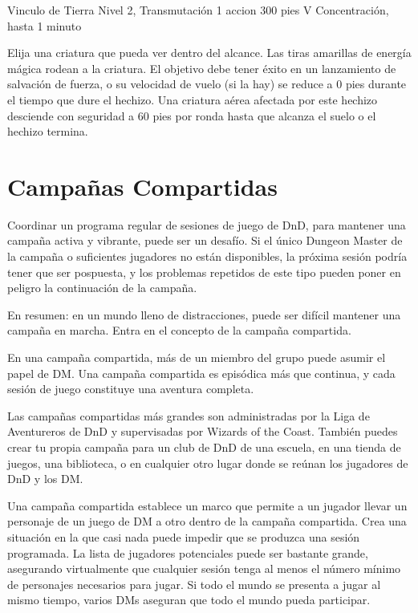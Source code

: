 \documentclass[a4paper,twocolumn,openany,10pt]{dndbook}
\begin{document}
\spellheader%
	{Vinculo de Tierra}
	{Nivel 2, Transmutación}
	{1 accion}
	{300 pies}
	{V}
	{Concentración, hasta 1 minuto}
	
	Elija una criatura que pueda ver dentro del alcance. Las tiras amarillas de energía mágica rodean a la criatura. El objetivo
	debe tener éxito en un lanzamiento de salvación de fuerza, o su velocidad de vuelo (si la hay) se reduce a 0 pies durante el
	tiempo que dure el hechizo. Una criatura aérea afectada por este hechizo desciende con seguridad a 60 pies por ronda hasta
	que alcanza el suelo o el hechizo termina. 

\appendix

\chapter{Campañas Compartidas}

Coordinar un programa regular de sesiones de juego de DnD, para mantener una campaña activa y vibrante, puede ser un desafío. Si
el único Dungeon Master de la campaña o suficientes jugadores no están disponibles, la próxima sesión podría tener que ser
pospuesta, y los problemas repetidos de este tipo pueden poner en peligro la continuación de la campaña.

En resumen: en un mundo lleno de distracciones, puede ser difícil mantener una campaña en marcha. Entra en el concepto de la
campaña compartida.

En una campaña compartida, más de un miembro del grupo puede asumir el papel de DM. Una campaña compartida es episódica más que
continua, y cada sesión de juego constituye una aventura completa.

Las campañas compartidas más grandes son administradas por la Liga de Aventureros de DnD y supervisadas por Wizards of the
Coast. También puedes crear tu propia campaña para un club de DnD de una escuela, en una tienda de juegos, una biblioteca, o en
cualquier otro lugar donde se reúnan los jugadores de DnD y los DM.

Una campaña compartida establece un marco que permite a un jugador llevar un personaje de un juego de DM a otro dentro de la
campaña compartida. Crea una situación en la que casi nada puede impedir que se produzca una sesión programada. La lista de
jugadores potenciales puede ser bastante grande, asegurando virtualmente que cualquier sesión tenga al menos el número mínimo de
personajes necesarios para jugar. Si todo el mundo se presenta a jugar al mismo tiempo, varios DMs aseguran que todo el mundo
pueda participar. 
\end{document}
